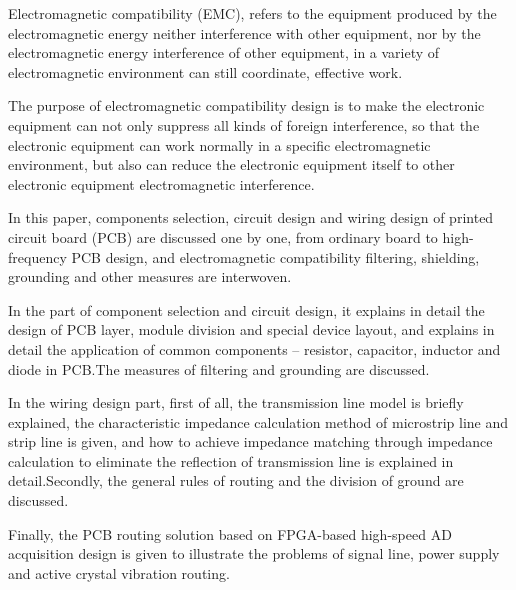\begin{enabstract}

Electromagnetic compatibility (EMC), refers to the equipment produced by the electromagnetic energy neither interference with other equipment, nor by the electromagnetic energy interference of other equipment, in a variety of electromagnetic environment can still coordinate, effective work.

The purpose of electromagnetic compatibility design is to make the electronic equipment can not only suppress all kinds of foreign interference, so that the electronic equipment can work normally in a specific electromagnetic environment, but also can reduce the electronic equipment itself to other electronic equipment electromagnetic interference.

In this paper, components selection, circuit design and wiring design of printed circuit board (PCB) are discussed one by one, from ordinary board to high-frequency PCB design, and electromagnetic compatibility filtering, shielding, grounding and other measures are interwoven.

In the part of component selection and circuit design, it explains in detail the design of PCB layer, module division and special device layout, and explains in detail the application of common components -- resistor, capacitor, inductor and diode in PCB.The measures of filtering and grounding are discussed.

In the wiring design part, first of all, the transmission line model is briefly explained, the characteristic impedance calculation method of microstrip line and strip line is given, and how to achieve impedance matching through impedance calculation to eliminate the reflection of transmission line is explained in detail.Secondly, the general rules of routing and the division of ground are discussed.

Finally, the PCB routing solution based on FPGA-based high-speed AD acquisition design is given to illustrate the problems of signal line, power supply and active crystal vibration routing.

\end{enabstract}
\par
\vspace*{2em}

